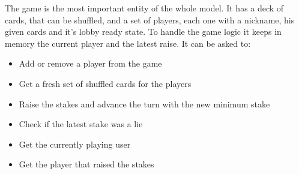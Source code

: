 \documentclass{scrartcl}
\begin{document}
The game is the most important entity of the whole model. It has a deck of cards, that can be shuffled,
and a set of players, each one with a nickname, his given cards and it's lobby ready state.
To handle the game logic it keeps in memory the current player and the latest raise. \newline
It can be asked to:
\begin{itemize}
      \item Add or remove a player from the game
      \item Get a fresh set of shuffled cards for the players
      \item Raise the stakes and advance the turn with the new minimum stake
      \item Check if the latest stake was a lie
      \item Get the currently playing user
      \item Get the player that raised the stakes
\end{itemize}
\end{document}
